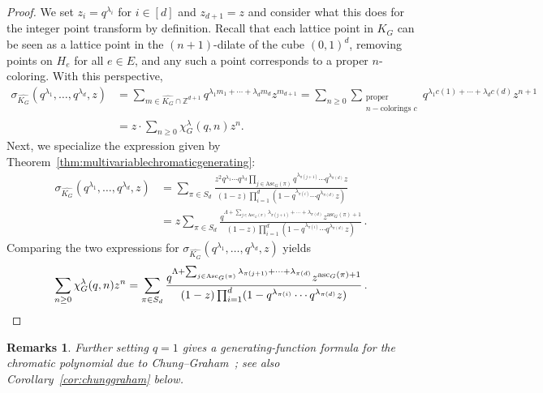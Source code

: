 \documentclass[11pt]{amsart}
\newtheorem*{rem}{Remarks}
\newenvironment{remark}{\begin{rem}\sf}{\end{rem}}
\newcommand{\asc}{\mathrm{Asc}}
\newcommand{\ascnum}{\mathrm{asc}}
\begin{document}
\begin{proof}
    We set $z_i = q^{\lambda_i}$ for $i \in [d]$ and $z_{d+1} = z$ and consider what this does for the integer point transform by definition.
    Recall that each lattice point in $K_G$ can be seen as a lattice point in the $(n+1)$-dilate of the cube
$(0,1)^d$, removing points on $H_e$ for all $e \in E$, and any such a point corresponds to a proper $n$-coloring. With this perspective,
\begin{align*}
        \sigma_{\widehat{K_G}} \left(q^{\lambda_1},\ldots,q^{\lambda_d},z \right)
        &= \sum_{m \in \widehat{K_G} \cap \mathbb{Z}^{d+1}} q^{\lambda_1 m_1 + \cdots +\lambda_d m_d} z^{m_{d+1}} 
         =\sum_{n \geq 0} \sum_{\substack{\text{proper } \\n-\text{colorings } c}} q^{ \lambda_1 c(1)+ \cdots +
\lambda_d c(d)} z^{n+1} \\
        &= z \cdot \sum_{n \geq 0}\chi_G^\lambda(q,n) z^n.
\end{align*}    
    Next, we specialize the expression given by Theorem~\ref{thm:multivariablechromaticgenerating}:
\begin{align*}
        \sigma_{\widehat{K_G}}(q^{\lambda_1},\ldots,q^{\lambda_d},z)
        &= \sum_{\pi \in S_d} \frac{ z^2 q^{\lambda_1} \cdots q^{\lambda_d} \prod_{j \in \asc_G(\pi)}
q^{\lambda_{\pi(j+1)}} \cdots q^{\lambda_{\pi(d)}} z }{(1-z) \prod_{i=1}^d (1-q^{\lambda_{\pi(i)}} \cdots
q^{\lambda_{\pi(d)}} z)} \\
         &= z \sum_{\pi \in S_d} \frac{ q^{ \Lambda + \sum_{j \in \asc_G(\pi)} \lambda_{\pi(j+1)} + \cdots +
\lambda_{\pi(d)}} z^{\ascnum_G(\pi)+1} }{(1-z) \prod_{i=1}^d (1-q^{\lambda_{\pi(i)}} \cdots q^{\lambda_{\pi(d)}}
z)} \, .
\end{align*} 
    Comparing the two expressions for $\sigma_{\widehat{K_G}}(q^{\lambda_1},\ldots,q^{\lambda_d},z)$ yields
    \[
        \sum_{n \geq 0}\chi_G^\lambda(q,n) z^n =\sum_{\pi \in S_d} \frac{ q^{ \Lambda + \sum_{j \in \asc_G(\pi)}
\lambda_{\pi(j+1)} + \cdots + \lambda_{\pi(d)}} z^{\ascnum_G(\pi)+1} }{(1-z) \prod_{i=1}^d
(1-q^{\lambda_{\pi(i)}} \cdots q^{\lambda_{\pi(d)}} z)} \, . \qedhere 
    \]
\end{proof}

\begin{remark}
    Further setting $q=1$ gives a generating-function formula for the chromatic polynomial due to Chung--Graham~\cite{chunggrahamcoverpol};
see also Corollary~\ref{cor:chunggraham} below.
\end{remark}
\end{document}
